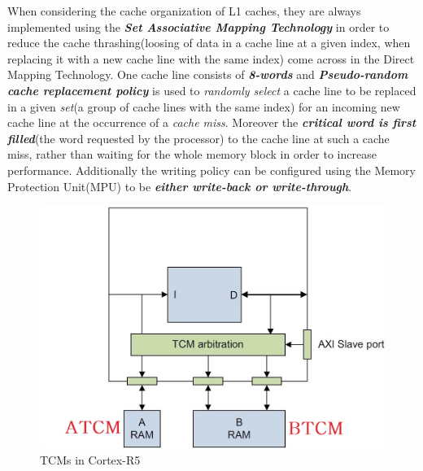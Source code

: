 \documentclass[a4paper,11pt]{article}
\begin{document}
 When considering the cache organization of L1 caches, they are always implemented using the \textit{\textbf{Set Associative Mapping Technology}} in order to reduce the cache thrashing(loosing of data in a cache line at a given index, when replacing it with a new cache line with the same index) come across in the Direct Mapping Technology. One cache line consists of \textit{\textbf{8-words}} and \textit{\textbf{Pseudo-random cache replacement policy}}  is used to \textit{randomly select} a cache line to be replaced in a given \textit{set}(a group of cache lines with the same index) for an incoming new cache line at the occurrence of a \textit{cache miss}. Moreover the \textbf{\textit{critical word is first filled}}(the word requested by the processor) to the cache line at such a cache miss, rather than waiting for the whole memory block in order to increase performance. Additionally the writing policy can be configured using the Memory Protection Unit(MPU) to be \textbf{\textit{either write-back or write-through}}.



\begin{figure}
	\includegraphics[scale= 0.315]{figures/tcm}
	\caption{TCMs in Cortex-R5} \label{tcm}
\end{figure}
\end{document}
